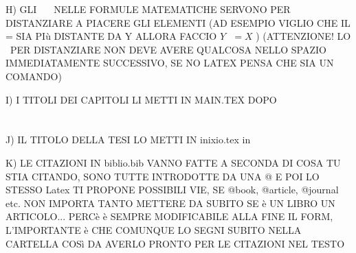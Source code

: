 H) GLI $\ \ \ \ \ $ NELLE FORMULE MATEMATICHE SERVONO PER DISTANZIARE A PIACERE GLI ELEMENTI (AD ESEMPIO VIGLIO CHE IL = SIA PIù DISTANTE  DA Y ALLORA FACCIO $Y \ \ \ = X$ )
(ATTENZIONE! LO \ PER DISTANZIARE NON DEVE AVERE QUALCOSA NELLO SPAZIO IMMEDIATAMENTE SUCCESSIVO, SE NO LATEX PENSA CHE SIA UN COMANDO)

I) I TITOLI DEI CAPITOLI LI METTI IN MAIN.TEX DOPO \chapter{}

J) IL TITOLO DELLA TESI LO METTI IN inixio.tex in 

K) LE CITAZIONI IN biblio.bib VANNO FATTE A SECONDA DI COSA TU STIA CITANDO, SONO TUTTE INTRODOTTE DA UNA @ E POI LO STESSO Latex TI PROPONE POSSIBILI VIE, SE @book, @article, @journal etc. NON IMPORTA TANTO METTERE DA SUBITO SE è UN LIBRO UN ARTICOLO... PERCè è SEMPRE MODIFICABILE ALLA FINE IL FORM, L'IMPORTANTE è CHE COMUNQUE LO SEGNI SUBITO NELLA CARTELLA COSì DA AVERLO PRONTO PER LE CITAZIONI NEL TESTO
